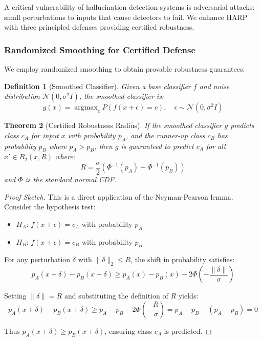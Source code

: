 \documentclass[11pt,a4paper]{article}
\newtheorem{theorem}{Theorem}[section]
\newtheorem{definition}[theorem]{Definition}
\newcommand{\argmax}{\operatorname{argmax}}
\begin{document}
A critical vulnerability of hallucination detection systems is adversarial attacks: small perturbations to inputs that cause detectors to fail. We enhance HARP with three principled defenses providing certified robustness.

\subsubsection{Randomized Smoothing for Certified Defense}

We employ randomized smoothing \citep{cohen2019certified} to obtain provable robustness guarantees:

\begin{definition}[Smoothed Classifier]
Given a base classifier $f$ and noise distribution $\mathcal{N}(0, \sigma^2 I)$, the smoothed classifier is:
\begin{equation}
    g(x) = \argmax_{c} P(f(x + \epsilon) = c), \quad \epsilon \sim \mathcal{N}(0, \sigma^2 I)
\end{equation}
\end{definition}

\begin{theorem}[Certified Robustness Radius]
\label{thm:harp_certified_radius}
If the smoothed classifier $g$ predicts class $c_A$ for input $x$ with probability $p_A$, and the runner-up class $c_B$ has probability $p_B$ where $p_A > p_B$, then $g$ is guaranteed to predict $c_A$ for all $x' \in B_2(x, R)$ where:
\begin{equation}
    R = \frac{\sigma}{2} \left(\Phi^{-1}(p_A) - \Phi^{-1}(p_B)\right)
\end{equation}
and $\Phi$ is the standard normal CDF.
\end{theorem}

\begin{proof}[Proof Sketch]
This is a direct application of the Neyman-Pearson lemma. Consider the hypothesis test:
\begin{itemize}
    \item $H_A$: $f(x + \epsilon) = c_A$ with probability $p_A$
    \item $H_B$: $f(x + \epsilon) = c_B$ with probability $p_B$
\end{itemize}

For any perturbation $\delta$ with $\|\delta\|_2 \leq R$, the shift in probability satisfies:
\begin{equation}
    p_A(x + \delta) - p_B(x + \delta) \geq p_A(x) - p_B(x) - 2\Phi\left(-\frac{\|\delta\|}{\sigma}\right)
\end{equation}

Setting $\|\delta\| = R$ and substituting the definition of $R$ yields:
\begin{equation}
    p_A(x+\delta) - p_B(x+\delta) \geq p_A - p_B - 2\Phi\left(-\frac{R}{\sigma}\right) = p_A - p_B - (p_A - p_B) = 0
\end{equation}

Thus $p_A(x+\delta) \geq p_B(x+\delta)$, ensuring class $c_A$ is predicted.
\end{proof}
\end{document}
